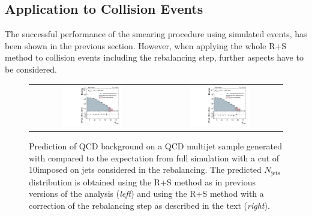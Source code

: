 \subsection{Application to Collision Events}
\label{subsec:RPlusS_app} 
The successful performance of the smearing procedure using simulated events, has been shown in the previous section. However, when applying the whole R+S method to collision events including the rebalancing step, further aspects have to be considered. 
\begin{figure}[!t]
  \centering
  \begin{tabular}{cc}
                \includegraphics[width=0.49\textwidth]{figures/NJets_baseline_withoutMHT_madgraph_DR53X_chs_TuneZ2star_pt10_withoutPUReweighting_DoNotUseRebCorrection_v1.pdf} &
                \includegraphics[width=0.49\textwidth]{figures/NJets_baseline_withoutMHT_madgraph_DR53X_chs_TuneZ2star_pt10_withoutPUReweighting_UseRebCorrection_v1.pdf} 

  \end{tabular}
  \caption{Prediction of QCD background on a QCD multijet sample generated with \madgraph compared to the expectation from full simulation with a \pt cut of 10\gev imposed on jets considered in the rebalancing. The predicted $N_{\text{jets}}$ distribution is obtained using the R+S method as in previous versions of the analysis (\textit{left}) and using the R+S method with a correction of the rebalancing step as described in the text (\textit{right}).}
  \label{fig:qcd_rs_rebnjets}
\end{figure}
\\
